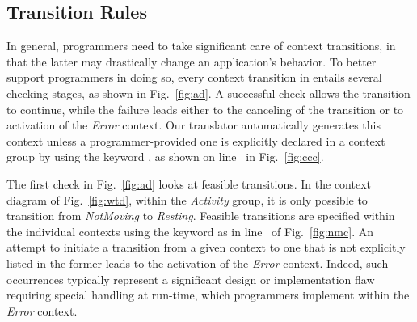 
\subsection{Transition Rules}\label{subsec:rules}


In general, programmers need to take significant care of context
transitions, in that the latter may drastically change an
application's behavior. To better support programmers in doing so,
every context transition in \conesc entails several checking stages,
as shown in Fig.~\ref{fig:ad}. A successful check allows the
transition to continue, while the failure leads either to the
canceling of the transition or to activation of the \emph{Error}
context. Our translator automatically generates this context unless a
programmer-provided one is explicitly declared in a context group by
using the keyword , as shown on line~
in Fig.~\ref{fig:ccc}.


The first check in Fig.~\ref{fig:ad} looks at feasible transitions. In
the context diagram of Fig.~\ref{fig:wtd}, within the \emph{Activity}
group, it is only possible to transition from \emph{NotMoving} to
\emph{Resting}. Feasible transitions are specified within the
individual contexts using the keyword  as in
line~ of Fig.~\ref{fig:nmc}. An attempt to
initiate a transition from a given context to one that is not
explicitly listed in the former leads to the activation of the
\emph{Error} context. Indeed, such occurrences typically represent a
significant design or implementation flaw requiring special handling
at run-time, which programmers implement within the \emph{Error} context.

